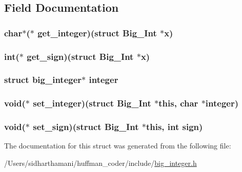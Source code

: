 \subsection{Field Documentation}
\hypertarget{struct_big___int_ac8d650b12656faee53d9ebd863e9fe8f}{
\subsubsection[{get\-\_\-integer}]{\setlength{\rightskip}{0pt plus 5cm}char$\ast$($\ast$ get\-\_\-integer)(struct {\bf Big\-\_\-\-Int} $\ast$x)}}\label{struct_big___int_ac8d650b12656faee53d9ebd863e9fe8f}
\hypertarget{struct_big___int_ae06ba678ba07ecdac264605bc8576da2}{
\subsubsection[{get\-\_\-sign}]{\setlength{\rightskip}{0pt plus 5cm}int($\ast$ get\-\_\-sign)(struct {\bf Big\-\_\-\-Int} $\ast$x)}}\label{struct_big___int_ae06ba678ba07ecdac264605bc8576da2}
\hypertarget{struct_big___int_af78495b20eeda6242727ea99032693c2}{
\subsubsection[{integer}]{\setlength{\rightskip}{0pt plus 5cm}struct {\bf big\-\_\-integer}$\ast$ integer}}\label{struct_big___int_af78495b20eeda6242727ea99032693c2}
\hypertarget{struct_big___int_a34a65fb8d8cc2acf5a14a18c420ee774}{
\subsubsection[{set\-\_\-integer}]{\setlength{\rightskip}{0pt plus 5cm}void($\ast$ set\-\_\-integer)(struct {\bf Big\-\_\-\-Int} $\ast$this, char $\ast${\bf integer})}}\label{struct_big___int_a34a65fb8d8cc2acf5a14a18c420ee774}
\hypertarget{struct_big___int_a70cf790b3af136aad25fa028cde3e801}{
\subsubsection[{set\-\_\-sign}]{\setlength{\rightskip}{0pt plus 5cm}void($\ast$ set\-\_\-sign)(struct {\bf Big\-\_\-\-Int} $\ast$this, int sign)}}\label{struct_big___int_a70cf790b3af136aad25fa028cde3e801}


The documentation for this struct was generated from the following file\-:\begin{DoxyCompactItemize}
\item 
/\-Users/sidharthamani/huffman\-\_\-coder/include/\hyperlink{big__integer_8h}{big\-\_\-integer.\-h}\end{DoxyCompactItemize}
